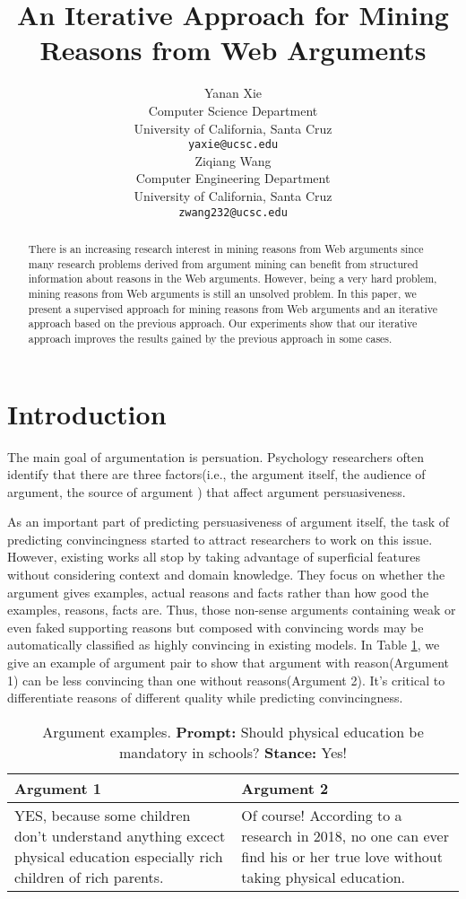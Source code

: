 \documentclass[11pt,a4paper]{article}
\title{An Iterative Approach for Mining Reasons from Web Arguments}
\author{Yanan Xie \\
Computer Science Department\\
University of California, Santa Cruz\\
  {\tt yaxie@ucsc.edu} \\\And
  Ziqiang Wang \\
Computer Engineering Department\\
University of California, Santa Cruz\\
  {\tt zwang232@ucsc.edu} \\}
\date{}
\begin{document}
\maketitle
\begin{abstract}
There is an increasing research interest in mining reasons from Web arguments since many research problems derived from argument mining can benefit from structured information about reasons in the Web arguments. However, being a very hard problem, mining reasons from Web arguments is still an unsolved problem. In this paper, we present a supervised approach for mining reasons from Web arguments and an iterative approach based on the previous approach. Our experiments show that our iterative approach improves the results gained by the previous approach in some cases.
\end{abstract}

\section{Introduction}

The main goal of argumentation is persuation\cite{nettel2012persuasive, mercier2011humans, blair2012argumentation}. Psychology researchers often identify that there are three factors(i.e., the argument itself, the audience of argument, the source of argument ) that affect argument persuasiveness\cite{petty1986elaboration}. 

As an important part of predicting persuasiveness of argument itself, the task of predicting convincingness started to attract researchers to work on this issue\cite{habernal2016argument}. However, existing works all stop by taking advantage of superficial features without considering context and domain knowledge. They focus on whether the argument gives examples, actual reasons and facts rather than how good the examples, reasons, facts are. Thus, those non-sense arguments containing weak or even faked supporting reasons but composed with convincing words may be automatically classified as highly convincing in existing models. In Table \ref{table:argumentexamples}, we give an example of argument pair to show that argument with reason(Argument 1) can be less convincing than one without reasons(Argument 2). It's critical to differentiate reasons of different quality while predicting convincingness. 

\begin{table}[h]
\begin{tabular}{| p{3.5cm} | p{3.5cm} | }
\hline
{\bf Argument 1} & {\bf Argument 2} \\
\hline
YES, because some children don’t understand anything excect physical education especially rich children of rich parents. & Of course!  According to a research in 2018, no one can ever find his or her true love without taking physical education.\\
\hline

\end{tabular}
\caption{Argument examples. {\bf Prompt:} Should physical education be mandatory in schools? {\bf Stance:} Yes!} 
\label{table:argumentexamples}
\end{table}
\end{document}
